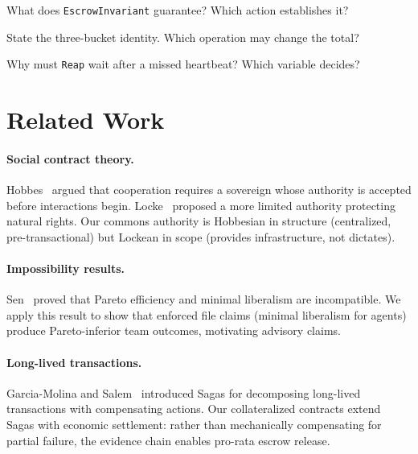 \documentclass[11pt,a4paper]{article}
\theoremstyle{definition}
\theoremstyle{remark}
\begin{document}
\pdexercisepointer*{\ref{ex:bonded-conservation-states}}{\ref{ex:bonded-conservation-weaken}}{\pageref{ex:bonded-conservation-states}}

\begin{pdrecitation}
\item What does \texttt{EscrowInvariant} guarantee? Which action establishes it?
\item State the three-bucket identity. Which operation may change the total?
\item Why must \texttt{Reap} wait after a missed heartbeat? Which variable decides?
\end{pdrecitation}

\section{Related Work}\label{sec:related}

\paragraph{Social contract theory.} Hobbes~ argued that cooperation requires a sovereign whose authority is accepted before interactions begin. Locke~ proposed a more limited authority protecting natural rights. Our commons authority is Hobbesian in structure (centralized, pre-transactional) but Lockean in scope (provides infrastructure, not dictates).

\paragraph{Impossibility results.} Sen~ proved that Pareto efficiency and minimal liberalism are incompatible. We apply this result to show that enforced file claims (minimal liberalism for agents) produce Pareto-inferior team outcomes, motivating advisory claims.

\paragraph{Long-lived transactions.} Garcia-Molina and Salem~ introduced Sagas for decomposing long-lived transactions with compensating actions. Our collateralized contracts extend Sagas with economic settlement: rather than mechanically compensating for partial failure, the evidence chain enables pro-rata escrow release.
\end{document}
